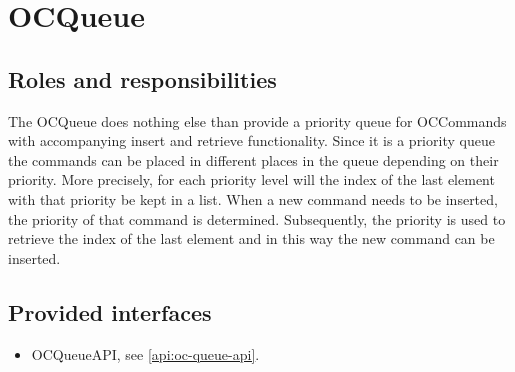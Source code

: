 \section{OCQueue}
\label{element:oc-queue}

\subsection{Roles and responsibilities}

\npar The OCQueue does nothing else than provide a priority queue for
OCCommands with accompanying insert and retrieve functionality. Since
it is a priority queue the commands can be placed in different places in the
queue depending on their priority. More precisely, for each priority level will
the index of the last element with that priority be kept in a list. When a new
command needs to be inserted, the priority of that command is determined.
Subsequently, the priority is used to retrieve the index of the last element and
in this way the new command can be inserted.

\subsection{Provided interfaces}

\begin{itemize}
  \item OCQueueAPI, see \ref{api:oc-queue-api}.
\end{itemize}